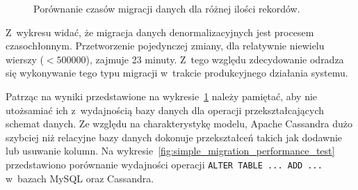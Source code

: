\begin{figure}[ht!]
	\centering

	\caption{Porównanie czasów migracji danych dla różnej ilości rekordów.}
	\label{fig:migration_performance_test}
\end{figure}

Z~wykresu widać, że migracja danych denormalizacyjnych jest procesem czasochłonnym. Przetworzenie pojedynczej zmiany, dla relatywnie niewielu wierszy ($< 500000$), zajmuje 23 minuty. Z~tego względu zdecydowanie odradza się wykonywanie tego typu migracji w~trakcie produkcyjnego działania systemu.

Patrząc na wyniki przedstawione na wykresie~\ref{fig:migration_performance_test} należy pamiętać, aby nie utożsamiać ich z~wydajnością bazy danych dla operacji przekształcających schemat danych. Ze względu na charakterystykę modelu, Apache Cassandra dużo szybciej niż relacyjne bazy danych dokonuje przekształceń takich jak dodawnie lub usuwanie kolumn. Na wykresie~\ref{fig:simple_migration_performance_test} przedstawiono porównanie wydajności operacji \verb+ALTER TABLE ... ADD ...+ w~bazach MySQL oraz Cassandra.

